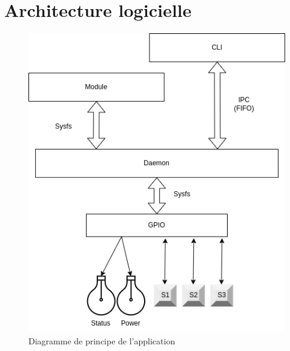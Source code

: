 \documentclass{ReportTemplate}
\begin{document}
\chapter{Architecture logicielle}
\begin{figure}[H]
    \includegraphics[width= \textwidth]{imageSources/Diagramme_Fonctions.drawio.png}
    \caption{Diagramme de principe de l'application}
    \label{fig:functionDiagram}
\end{figure}
\end{document}
